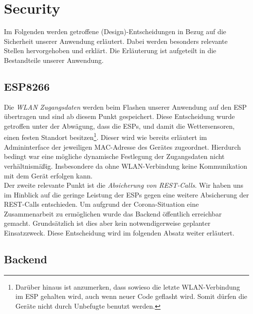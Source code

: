 

\section{Security}\label{Security}
Im Folgenden werden getroffene (Design)-Entscheidungen in Bezug auf die Sicherheit unserer Anwendung erläutert.
Dabei werden besonders relevante Stellen hervorgehoben und erklärt.
Die Erläuterung ist aufgeteilt in die Bestandteile unserer Anwendung.

\subsection{ESP8266}

Die \textit{WLAN Zugangsdaten} werden beim Flashen unserer Anwendung auf den ESP übertragen und sind ab diesem Punkt gespeichert.
Diese Entscheidung wurde getroffen unter der Abwägung, dass die ESPs, und damit die Wettersensoren, einen festen Standort besitzen\footnote{Darüber hinaus ist anzumerken, dass sowieso die letzte WLAN-Verbindung im ESP gehalten wird, auch wenn neuer Code geflasht wird. Somit dürfen die Geräte nicht durch Unbefugte benutzt werden.}.
Dieser wird wie bereits erläutert im Admininterface der jeweiligen MAC-Adresse des Gerätes zugeordnet.
Hierdurch bedingt war eine mögliche dynamische Festlegung der Zugangsdaten nicht verhältnismäßig.
Insbesondere da ohne WLAN-Verbindung keine Kommunikation mit dem Gerät erfolgen kann.\\
Der zweite relevante Punkt ist die \textit{Absicherung von REST-Calls}.
Wir haben uns im Hinblick auf die geringe Leistung der ESPs gegen eine weitere Absicherung der REST-Calls entschieden.
Um aufgrund der Corona-Situation eine Zusammenarbeit zu ermöglichen wurde das Backend öffentlich erreichbar gemacht.
Grundsätzlich ist dies aber kein notwendigerweise geplanter Einsatzzweck.
Diese Entscheidung wird im folgenden Absatz weiter erläutert.

\subsection{Backend}

